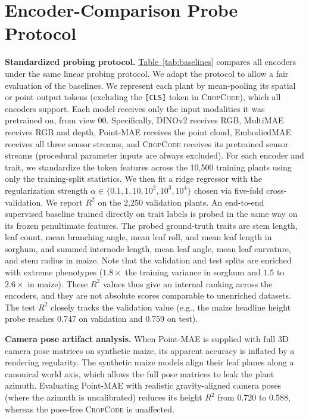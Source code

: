 \documentclass[10pt,twocolumn,letterpaper]{article}
\newcommand{\tabref}[1]{\hyperref[#1]{Table~\ref*{#1}}}
\newcommand{\method}{\textup{\textsc{CropCode}}}   %
\begin{document}
\section{Encoder-Comparison Probe Protocol}
\label{app:probe}

\noindent\textbf{Standardized probing protocol.}
\tabref{tab:baselines} compares all encoders under the same linear probing protocol. We adapt the protocol to allow a fair evaluation of the baselines. We represent each plant by mean-pooling its spatial or point output tokens (excluding the \texttt{[CLS]} token in \method{}), which all encoders support. Each model receives only the input modalities it was pretrained on, from view 00. Specifically, DINOv2 receives RGB, MultiMAE receives RGB and depth, Point-MAE receives the point cloud, EmbodiedMAE receives all three sensor streams, and \method{} receives its pretrained sensor streams (procedural parameter inputs are always excluded). For each encoder and trait, we standardize the token features across the 10{,}500 training plants using only the training-split statistics. We then fit a ridge regressor with the regularization strength $\alpha \in \{0.1, 1, 10, 10^2, 10^3, 10^4\}$ chosen via five-fold cross-validation. We report $R^2$ on the 2{,}250 validation plants. An end-to-end supervised baseline trained directly on trait labels is probed in the same way on its frozen penultimate features. The probed ground-truth traits are stem length, leaf count, mean branching angle, mean leaf roll, and mean leaf length in sorghum, and summed internode length, mean leaf angle, mean leaf curvature, and stem radius in maize. Note that the validation and test splits are enriched with extreme phenotypes ($1.8\times$ the training variance in sorghum and $1.5$ to $2.6\times$ in maize). These $R^2$ values thus give an internal ranking across the encoders, and they are not absolute scores comparable to unenriched datasets. The test $R^2$ closely tracks the validation value (e.g., the maize headline height probe reaches 0.747 on validation and 0.759 on test).

\noindent\textbf{Camera pose artifact analysis.}
When Point-MAE is supplied with full 3D camera pose matrices on synthetic maize, its apparent accuracy is inflated by a rendering regularity. The synthetic maize models align their leaf planes along a canonical world axis, which allows the full pose matrices to leak the plant azimuth. Evaluating Point-MAE with realistic gravity-aligned camera poses (where the azimuth is uncalibrated) reduces its height $R^2$ from 0.720 to 0.588, whereas the pose-free \method{} is unaffected.
\end{document}
